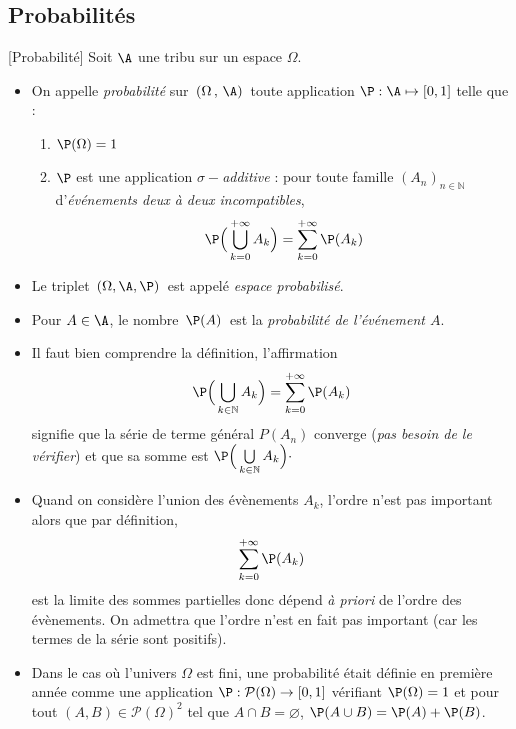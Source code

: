 \documentclass[a4paper,10pt]{report}
\begin{document}
\begin{itemize}
\subsection{Probabilités}

\begin{Definition}{}[Probabilité]
Soit $\A$ une tribu sur un espace $\Omega$. 

\begin{itemize}
\item On appelle \emph{probabilité} sur $\,(\Omega\,,\,\A)\,$ toute application $\P : \A \mapsto [0,1]$ telle que : 
\begin{enumerate}
\item $\P(\Omega )=1$
\item $\P$ est une application \emph{$\sigma -$additive} : pour toute famille $(A_n)_{n\in \mathbb N}$ d'\emph{événements deux à deux incompatibles}, 
\[ \P\Big(\bigcup\limits_{k=0}^{+ \infty} A_k\Big) = \sum\limits_{k=0}^{+\infty } \P(A_k)  \]
\end{enumerate}
\item Le triplet $\,(\Omega , \A , \P)\,$ est appelé \emph{espace probabilisé}. 
\item Pour $A\in\A$, le nombre $\,\P(A)\,$ est la \emph{probabilité de l'événement $A$}.
\end{itemize} 
\end{Definition}

\begin{Remarques}{}
\begin{itemize} 
\item Il faut bien comprendre  la définition, l'affirmation 
\[  \P\Big(\bigcup\limits_{k\in \mathbb N} A_k\Big) = \sum\limits_{k=0}^{+\infty } \P(A_k) \]
signifie que la série de terme général $P(A_n)$ converge (\emph{pas besoin de le vérifier}) et que sa somme est $\P\Big(\bigcup\limits_{k\in \mathbb N} A_k\Big) \cdot$
\item Quand on considère l'union des évènements $A_k$, l'ordre n'est pas important alors que par définition,
$$ \sum\limits_{k=0}^{+\infty } \P(A_k)$$
est la limite des sommes partielles donc dépend \emph{à priori} de l'ordre des évènements. On admettra que l'ordre n'est en fait pas important (car les termes de la série sont positifs).
\item Dans le cas où l'univers $\Omega$ est fini, une probabilité était définie en première année comme une application $\P : \mathcal{P}(\Omega) \rightarrow [0,1]$ vérifiant $\P(\Omega)=1$ et pour tout $(A,B) \in \mathcal{P}(\Omega)^2$ tel que $A \cap B=\varnothing$, $\P(A \cup B)=\P(A)+\P(B)$.
\end{itemize}
\end{Remarques}{}


\end{itemize}
\end{document}
